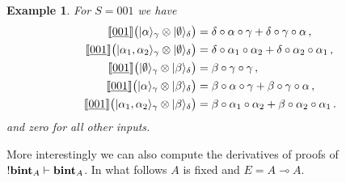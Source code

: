 \documentclass[english,letter paper,12pt,reqno]{article}
\DeclarePairedDelimiter\ket{\lvert}{\rangle}
\theoremstyle{example}
\newtheorem{example}[theorem]{Example}
\begin{document}
\begin{example} For $S = 001$ we have
\begin{align*}
\den{\underline{001}}\big( \ket{\alpha}_\gamma \otimes \ket{\emptyset}_\delta \big) &= \delta \circ \alpha \circ \gamma + \delta \circ \gamma \circ \alpha\,,\\
\den{\underline{001}}\big( \ket{\alpha_1,\alpha_2}_\gamma \otimes \ket{\emptyset}_\delta \big) &= \delta \circ \alpha_1 \circ \alpha_2 + \delta \circ \alpha_2 \circ \alpha_1\,,\\
\den{\underline{001}}\big( \ket{\emptyset}_\gamma \otimes \ket{\beta}_\delta \big) &= \beta \circ \gamma \circ \gamma\,,\\
\den{\underline{001}}\big( \ket{\alpha}_\gamma \otimes \ket{\beta}_\delta \big) &= \beta \circ \alpha \circ \gamma + \beta \circ \gamma \circ \alpha\,,\\
\den{\underline{001}}\big( \ket{\alpha_1,\alpha_2}_\gamma \otimes \ket{\beta}_\delta \big) &= \beta \circ \alpha_1 \circ \alpha_2 + \beta \circ \alpha_2 \circ \alpha_1\,.
\end{align*}
and zero for all other inputs.
\end{example}

More interestingly we can also compute the derivatives of proofs of ${!}\textbf{bint}_A \vdash \textbf{bint}_A$. In what follows $A$ is fixed and $E = A \multimap A$.
\end{document}
